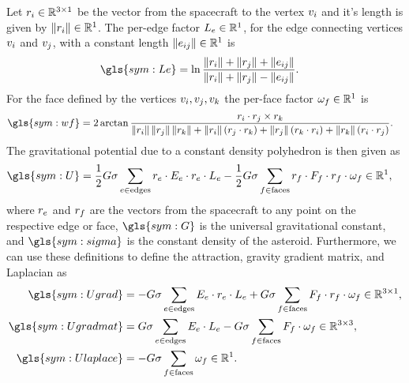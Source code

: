 Let \( r_i \in \mathbb{R}^{3 \times 1} \) be the vector from the spacecraft to the vertex \( v_i \) and it's length is given by \( \left\| r_i \right\| \in \mathbb{R}^{1} \).
The per-edge factor \( L_e \in \mathbb{R}^{1}\), for the edge connecting vertices \( v_i \) and \( v_j \), with a constant length \( \left\| e_{ij} \right\| \in \mathbb{R}^1\) is
\begin{align}\label{eq:edge_factor}
    \gls{sym:Le} &= \ln \frac{\norm{r_i} + \norm{r_j} + \norm{e_{ij}}}{\norm{r_i} + \norm{r_j} - \norm{e_{ij}}}.
\end{align}
For the face defined by the vertices \( v_i, v_j, v_k \) the per-face factor \( \omega_f \in \mathbb{R}^{1} \) is
\begin{align}\label{eq:face_factor}
    \gls{sym:wf} &= 2 \arctan \frac{\vc{r}_i \cdot \vc{r}_j \times \vc{r}_k}{\norm{r_i} \norm{r_j} \norm{r_k} + \norm{r_i} \parenth{\vc{r}_j \cdot \vc{r}_k} + \norm{r_j} \parenth{\vc{r}_k \cdot \vc{r}_i} + \norm{r_k} \parenth{\vc{r}_i \cdot \vc{r}_j}}.
\end{align}
The gravitational potential due to a constant density polyhedron is then given as
\begin{align}\label{eq:potential}
    \gls{sym:U} &= \frac{1}{2} G \sigma \sum_{e \in \text{edges}} \vc{r}_e \cdot E_e \cdot \vc{r}_e \cdot L_e - \frac{1}{2}G \sigma \sum_{f \in \text{faces}} \vc{r}_f \cdot F_f \cdot \vc{r}_f \cdot \omega_f \in \R^1,
\end{align}
where \( r_e\) and \(r_f \) are the vectors from the spacecraft to any point on the respective edge or face, \( \gls{sym:G}\) is the universal gravitational constant, and \( \gls{sym:sigma} \) is the constant density of the asteroid.
Furthermore, we can use these definitions to define the attraction, gravity gradient matrix, and Laplacian as
\begin{align}
    \gls{sym:Ugrad} &= -G \sigma \sum_{e \in \text{edges}} E_e \cdot \vc{r}_e \cdot L_e + G \sigma \sum_{f \in \text{faces}} F_f \cdot \vc{r}_f \cdot \omega_f \in \R^{3 \times 1} , \label{eq:attraction}\\
    \gls{sym:Ugradmat} &= G \sigma \sum_{e \in \text{edges}} E_e  \cdot L_e - G \sigma \sum_{f \in \text{faces}} F_f \cdot \omega_f \in \R^{3 \times 3}, \label{eq:gradient_matrix}\\
    \gls{sym:Ulaplace} &= -G \sigma \sum_{f \in \text{faces}}  \omega_f \in \R^1.\label{eq:laplacian}
\end{align}

